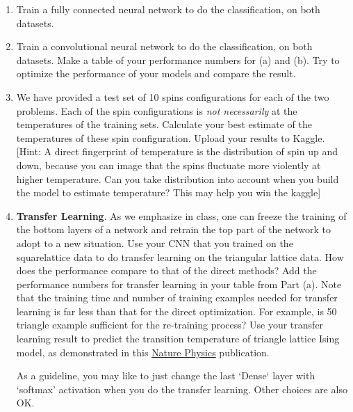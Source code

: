 \documentclass[12pt]{amsart}
\begin{document}
\begin{enumerate}
\begin{enumerate}
\vskip 0.7cm
\item  Train a fully connected neural network to do the classification, on both datasets.
\vskip 0.7cm
\item Train a convolutional neural network to do the classification, on both datasets. Make a table of your performance numbers for (a) and (b). Try to optimize the performance of your models and compare the result. 
\vskip 0.7cm
\item We have provided a test set of 10 spins configurations for each of the two problems. Each of  the spin configurations is {\sl not necessarily} at the temperatures of the training sets.  Calculate your best estimate of the temperatures of these spin configuration. Upload your results to Kaggle. [Hint: A direct fingerprint of temperature is the distribution of spin up and down, because you can image that the spins fluctuate more violently at higher temperature. Can you take distribution into account when you build the model to estimate temperature? This may help you win the kaggle]
\vskip 0.7cm
\item {\bf Transfer Learning}. As we emphasize in class, one can freeze the training of the bottom layers of a network and retrain the top part of the network to adopt to a new situation. Use your CNN that you trained on the squarelattice data to do transfer learning on the triangular lattice data.  How does the performance compare to that of the direct methods?  Add the performance numbers for transfer learning in your table from Part (a). Note that the training time and number of training examples needed for transfer learning is far less than that for the direct  optimization. For  example,  is  50  triangle  example  sufficient  for the re-training process?  Use your transfer learning result to predict the transition temperature of triangle lattice Ising model, as demonstrated in this \href{https://www-nature-com.ezp-prod1.hul.harvard.edu/articles/nphys4035.pdf}{Nature Physics} publication.

As a guideline, you may like to just change the last `Dense` layer with `softmax' activation when you do the transfer learning. Other choices are also OK.


\end{enumerate}
\end{enumerate}
\end{document}
